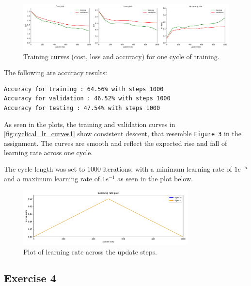 \documentclass[11pt]{article}
\begin{document}
\begin{figure}[H]
    \centering
    \includegraphics[width=1\textwidth]{cyclic_training_curves_ex3.jpg}
    \caption{Training curves (cost, loss and accuracy) for one cycle of training.}
    \label{fig:cyclical_lr_curves1}
\end{figure}


The following are accuracy results: 
\begin{lstlisting}[caption={Training and validation accuracy for one cycle}, label={lst:accuracy}]
Accuracy for training : 64.56% with steps 1000
Accuracy for validation : 46.52% with steps 1000
Accuracy for testing : 47.54% with steps 1000
\end{lstlisting}

As seen in the plots, the training and validation curves in \autoref{fig:cyclical_lr_curves1} show consistent descent, that resemble \texttt{Figure 3} in the assignment.
The curves are smooth and reflect the expected rise and fall of learning rate across one cycle. 

The cycle length was set to 1000 iterations, with a minimum learning rate of \(1e^{-5}\) and a maximum learning rate of \(1e^{-1}\) as seen in the plot below.
\begin{figure}[H]
    \centering
    \includegraphics[width=0.8\textwidth]{cyclic_eta1.jpg}
    \caption{Plot of learning rate across the update steps.}
    \label{fig:cyclic_eta1}
\end{figure}


\subsection*{Exercise 4}
\end{document}
